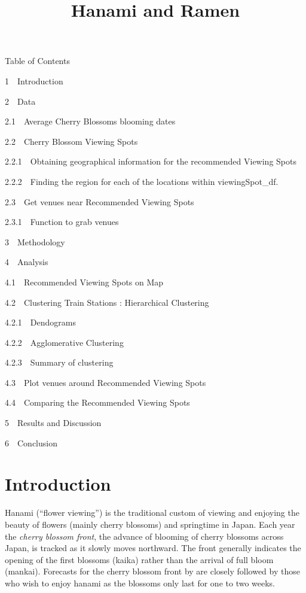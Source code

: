 \documentclass[11pt]{article}
\title{Hanami and Ramen}
\date{}
\begin{document}
    
\maketitle
    
Table of Contents{}

{{1~~}Introduction}

{{2~~}Data }

{{2.1~~}Average Cherry Blossoms blooming dates}

{{2.2~~}Cherry Blossom Viewing Spots}

{{2.2.1~~}Obtaining geographical information for the recommended Viewing
Spots}

{{2.2.2~~}Finding the region for each of the locations
within viewingSpot\_df.}

{{2.3~~}Get venues near Recommended Viewing Spots}

{{2.3.1~~}Function to grab venues}

{{3~~}Methodology }

{{4~~}Analysis }

{{4.1~~}Recommended Viewing Spots on Map}

{{4.2~~}Clustering Train Stations : Hierarchical Clustering}

{{4.2.1~~}Dendograms}

{{4.2.2~~}Agglomerative Clustering}

{{4.2.3~~}Summary of clustering}

{{4.3~~}Plot venues around Recommended Viewing Spots}

{{4.4~~}Comparing the Recommended Viewing Spots}

{{5~~}Results and Discussion }

{{6~~}Conclusion }

    \hypertarget{introduction}{%
\section{Introduction}\label{introduction}}

    Hanami (``flower viewing'') is the traditional custom of viewing and
enjoying the beauty of flowers (mainly cherry blossoms) and springtime
in Japan. Each year the \emph{cherry blossom front}, the advance of
blooming of cherry blossoms across Japan, is tracked as it slowly moves
northward. The front generally indicates the opening of the first
blossoms (kaika) rather than the arrival of full bloom (mankai).
Forecasts for the cherry blossom front by are closely followed by those
who wish to enjoy hanami as the blossoms only last for one to two weeks.
\end{document}
